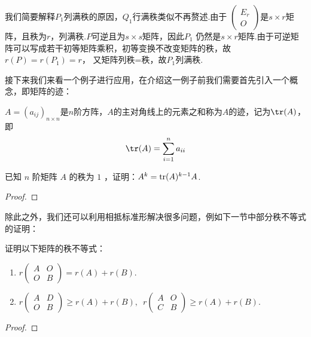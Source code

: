 我们简要解释$P_1$列满秩的原因，$Q_1$行满秩类似不再赘述.由于
$\begin{pmatrix}
    E_r \\ O
\end{pmatrix}$是$s\times r$矩阵，且秩为$r$，列满秩.$P$可逆且为$s\times s$矩阵，因此$P_1$
仍然是$s\times r$矩阵.由于可逆矩阵可以写成若干初等矩阵乘积，初等变换不改变矩阵的秩，故$r(P)=r(P_1)=r$，
又矩阵列秩=秩，故$P_1$列满秩.

接下来我们来看一个例子进行应用，在介绍这一例子前我们需要首先引入一个概念，即矩阵的迹：
\begin{definition}
    $A=(a_{ij})_{n\times n}$是$n$阶方阵，$A$的主对角线上的元素之和称为$A$的迹，记为$\tr(A)$，即
    \[\tr(A)=\sum_{i=1}^n a_{ii}\]
\end{definition}
\begin{example}\label{ex:11:相抵分解}
    已知 $n$ 阶矩阵 $A$ 的秩为 $1$ ，证明：$A^k=\textup{tr}(A)^{k-1}A$.
\end{example}
\begin{proof}
    
\end{proof}

除此之外，我们还可以利用相抵标准形解决很多问题，例如下一节中部分秩不等式的证明：
\begin{example}\label{ex:11:分块秩不等式}
    证明以下矩阵的秩不等式：
    \begin{enumerate}
        \item $r\begin{pmatrix}
            A & O \\ O & B
        \end{pmatrix}=r(A)+r(B)$.

        \item $r\begin{pmatrix}
            A & D \\ O & B
        \end{pmatrix}\geqslant r(A)+r(B),\enspace r\begin{pmatrix}
            A & O \\ C & B
        \end{pmatrix}\geqslant r(A)+r(B)$.
    \end{enumerate}
\end{example}
\begin{proof}
    
\end{proof}

